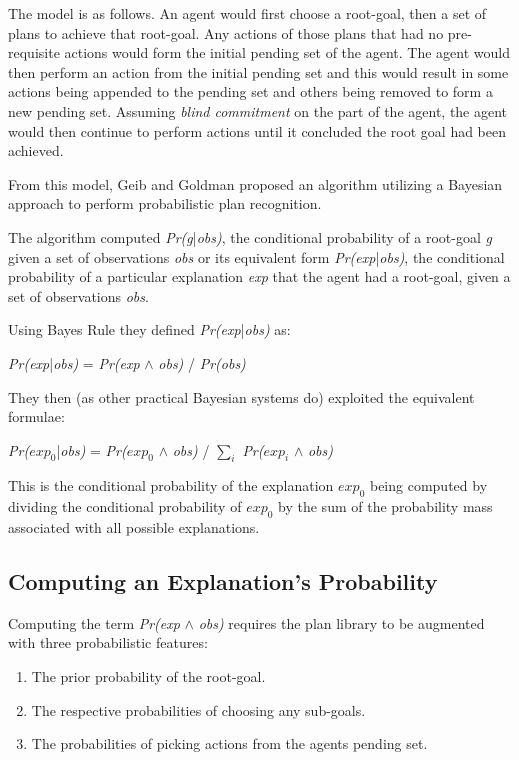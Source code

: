 \documentclass[parskip]{cs4rep}
\begin{document}
The model is as follows. An agent would first choose a root-goal, then a set of plans to achieve that root-goal. Any actions of those plans that had no pre-requisite actions would form the initial pending set of the agent. The agent would then perform an action from the initial pending set and this would result in some actions being appended to the pending set and others being removed to form a new pending set. Assuming \textit{blind commitment} on the part of the agent, the agent would then continue to perform actions until it concluded the root goal had been achieved.

From this model, Geib and Goldman proposed an algorithm utilizing a Bayesian approach to perform probabilistic plan recognition. 

The algorithm computed \textit{Pr(g}|\textit{obs)}, the conditional probability of a root-goal \textit{g} given a set of observations \textit{obs} or its equivalent form \textit{Pr(exp}|\textit{obs)}, the conditional probability of a particular explanation \textit{exp} that the agent had a root-goal, given a set of observations \textit{obs}.

Using Bayes Rule they defined \textit{Pr(exp}|\textit{obs)} as:\newline

\centerline{
\textit{Pr(exp}|\textit{obs)} = \textit{Pr(exp} $\wedge$ \textit{obs)} / \textit{Pr(obs)}
}

They then (as other practical Bayesian systems do) exploited the equivalent formulae:\newline

\centerline{
\textit{Pr($exp_0$}|\textit{obs)} = \textit{Pr($exp_0$} $\wedge$ \textit{obs)} / $\displaystyle\sum\nolimits_{i}$ \textit{Pr($exp_i$} $\wedge$ \textit{obs)}
}

This is the conditional probability of the explanation $exp_0$ being computed by dividing the conditional probability of $exp_0$  by the sum of the probability mass associated with all possible explanations.

\subsection{Computing an Explanation's Probability}

Computing the term \textit{Pr(exp} $\wedge$ \textit{obs)} requires the plan library to be augmented with three probabilistic features:\newline

\begin{enumerate}
\item
The prior probability of the root-goal.
\item
The respective probabilities of choosing any sub-goals.
\item
The probabilities of picking actions from the agents pending set.
\end{enumerate}
\end{document}
